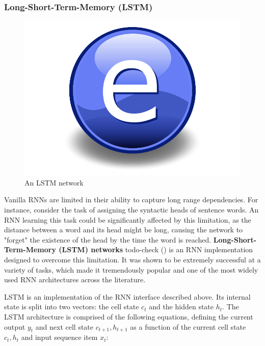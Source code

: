 \subsubsection{Long-Short-Term-Memory (LSTM)}

\begin{figure}
    \centering
    \includegraphics{Figures/Electron.pdf}
    \caption{An LSTM network}
    \label{fig:lstm}
\end{figure}

Vanilla RNNs are limited in their ability to capture long range dependencies. For instance, consider the task of assigning the syntactic heads of sentence words. An RNN learning this task could be significantly affected by this limitation, as the distance between a word and its head might be long, causing the network to "forget" the existence of the head by the time the word is reached. \textbf{Long-Short-Term-Memory (LSTM) networks} todo-check (\cite{lstm}) is an RNN implementation designed to overcome this limitation. It was shown to be extremely successful at a variety of tasks, which made it tremendously popular and one of the most widely used RNN architectures across the literature.  

LSTM is an implementation of the RNN interface described above. Its internal state is split into two vectors: the cell state $c_t$ and the hidden state $h_t$. The LSTM architecture is comprised of the following equations, defining the current output $y_t$ and next cell state $c_{t + 1}, h_{t + 1}$ as a function of the current cell state $c_t, h_t$ and input sequence item $x_t$:


